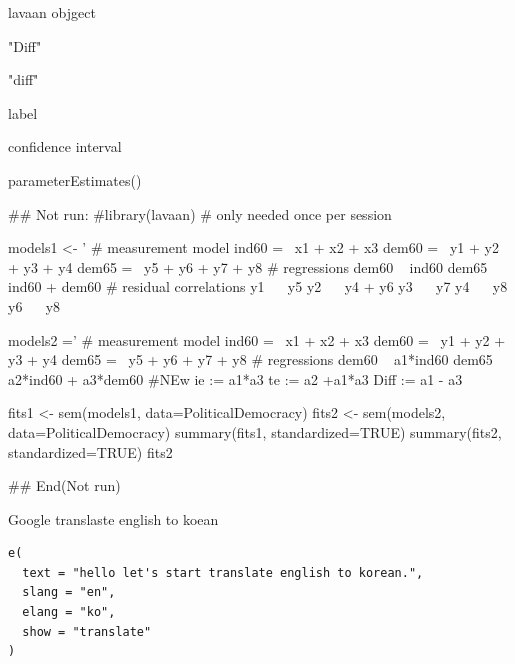 \documentclass[a4paper]{book}
\begin{document}
%
\begin{Arguments}
\begin{ldescription}
\item[\code{model\_sem}] lavaan objgect

\item[\code{effect1}] "Diff"

\item[\code{effect2}] "diff"

\item[\code{label}] label

\item[\code{ci}] confidence interval
\end{ldescription}
\end{Arguments}
%
\begin{Value}
parameterEstimates()
\end{Value}
%
\begin{Examples}
\begin{ExampleCode}

## Not run: 
#library(lavaan) # only needed once per session

models1 <- '
  # measurement model
    ind60 =~ x1 + x2 + x3
    dem60 =~ y1 + y2 + y3 + y4
    dem65 =~ y5 + y6 + y7 + y8
    # regressions
    dem60 ~ ind60
    dem65 ~ ind60 + dem60
      # residual correlations
    y1 ~~ y5
    y2 ~~ y4 + y6
    y3 ~~ y7
    y4 ~~ y8
    y6 ~~ y8

models2 ='
  # measurement model
    ind60 =~ x1 + x2 + x3
    dem60 =~ y1 + y2 + y3 + y4
    dem65 =~ y5 + y6 + y7 + y8
     # regressions
    dem60 ~ a1*ind60
    dem65 ~ a2*ind60 + a3*dem60
 #NEw
   ie := a1*a3
   te := a2 +a1*a3
   Diff := a1 - a3




fits1 <- sem(models1, data=PoliticalDemocracy)
fits2 <- sem(models2, data=PoliticalDemocracy)
summary(fits1, standardized=TRUE)
summary(fits2, standardized=TRUE)
fits2 %

## End(Not run)
\end{ExampleCode}
\end{Examples}
%
\begin{Description}
Google translaste english  to koean
\end{Description}
%
\begin{Usage}
\begin{verbatim}
e(
  text = "hello let's start translate english to korean.",
  slang = "en",
  elang = "ko",
  show = "translate"
)
\end{verbatim}
\end{Usage}
\end{document}
